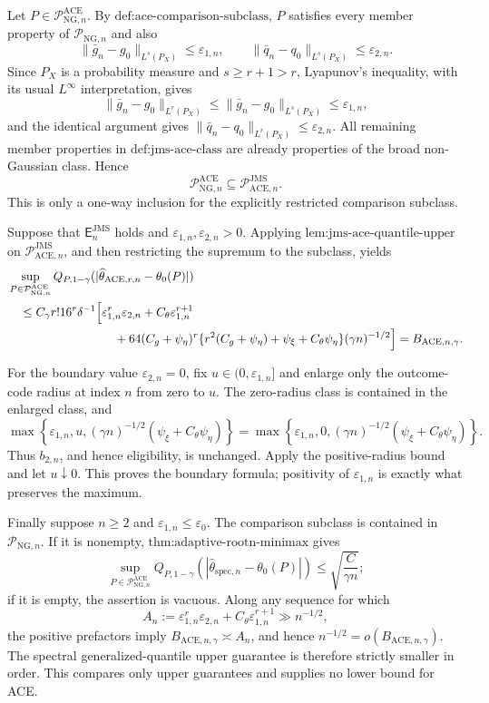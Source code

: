 Let \(P\in\mathcal P_{\mathrm{NG},n}^{\mathrm{ACE}}\).  By \(\text{def:ace-comparison-subclass}\), \(P\) satisfies every member property of \(\mathcal P_{\mathrm{NG},n}\) and also
\[
 \|\bar g_n-g_0\|_{L^s(P_X)}\le\varepsilon_{1,n},
 \qquad
 \|\bar q_n-q_0\|_{L^s(P_X)}\le\varepsilon_{2,n}.
\]
Since \(P_X\) is a probability measure and \(s\ge r+1>r\), Lyapunov's inequality, with its usual \(L^{\infty}\) interpretation, gives
\[
 \|\bar g_n-g_0\|_{L^r(P_X)}
 \le\|\bar g_n-g_0\|_{L^s(P_X)}
 \le\varepsilon_{1,n},
\]
and the identical argument gives \(\|\bar q_n-q_0\|_{L^r(P_X)}\le\varepsilon_{2,n}\).  All remaining member properties in \(\text{def:jms-ace-class}\) are already properties of the broad non-Gaussian class.  Hence
\[
 \mathcal P_{\mathrm{NG},n}^{\mathrm{ACE}}\subseteq\mathcal P_{\mathrm{ACE},n}^{\mathrm{JMS}}.
\]
This is only a one-way inclusion for the explicitly restricted comparison subclass.

Suppose that \(\mathsf E_n^{\mathrm{JMS}}\) holds and \(\varepsilon_{1,n},\varepsilon_{2,n}>0\).  Applying \(\text{lem:jms-ace-quantile-upper}\) on \(\mathcal P_{\mathrm{ACE},n}^{\mathrm{JMS}}\), and then restricting the supremum to the subclass, yields
\[
\begin{aligned}
 &\sup_{P\in\mathcal P_{\mathrm{NG},n}^{\mathrm{ACE}}}
 Q_{P,1-\gamma}(|\widehat\theta_{\mathrm{ACE},r,n}-\theta_0(P)|)\\
 &\quad\le C_{\gamma}r!16^r\delta^{-1}
 \Big[\varepsilon_{1,n}^r\varepsilon_{2,n}+C_{\theta}\varepsilon_{1,n}^{r+1}\\
 &\hspace{31mm}+64(C_g+\psi_{\eta})^r
 \{r^2(C_g+\psi_{\eta})+\psi_{\xi}+C_{\theta}\psi_{\eta}\}
 (\gamma n)^{-1/2}\Big]
 =B_{\mathrm{ACE},n,\gamma}.
\end{aligned}
\]

For the boundary value \(\varepsilon_{2,n}=0\), fix \(u\in(0,\varepsilon_{1,n}]\) and enlarge only the outcome-code radius at index \(n\) from zero to \(u\).  The zero-radius class is contained in the enlarged class, and
\[
 \max\!\left\{\varepsilon_{1,n},u,(\gamma n)^{-1/2}(\psi_{\xi}+C_{\theta}\psi_{\eta})\right\}
 =\max\!\left\{\varepsilon_{1,n},0,(\gamma n)^{-1/2}(\psi_{\xi}+C_{\theta}\psi_{\eta})\right\}.
\]
Thus \(b_{2,n}\), and hence eligibility, is unchanged.  Apply the positive-radius bound and let \(u\downarrow0\).  This proves the boundary formula; positivity of \(\varepsilon_{1,n}\) is exactly what preserves the maximum.

Finally suppose \(n\ge2\) and \(\varepsilon_{1,n}\le\varepsilon_0\).  The comparison subclass is contained in \(\mathcal P_{\mathrm{NG},n}\).  If it is nonempty, \(\text{thm:adaptive-rootn-minimax}\) gives
\[
 \sup_{P\in\mathcal P_{\mathrm{NG},n}^{\mathrm{ACE}}}
 Q_{P,1-\gamma}(|\widehat\theta_{\mathrm{spec},n}-\theta_0(P)|)
 \le\sqrt{\frac{C}{\gamma n}};
\]
if it is empty, the assertion is vacuous.  Along any sequence for which
\[
 A_n:=\varepsilon_{1,n}^r\varepsilon_{2,n}+C_{\theta}\varepsilon_{1,n}^{r+1}\gg n^{-1/2},
\]
the positive prefactors imply \(B_{\mathrm{ACE},n,\gamma}\asymp A_n\), and hence \(n^{-1/2}=o(B_{\mathrm{ACE},n,\gamma})\).  The spectral generalized-quantile upper guarantee is therefore strictly smaller in order.  This compares only upper guarantees and supplies no lower bound for ACE.